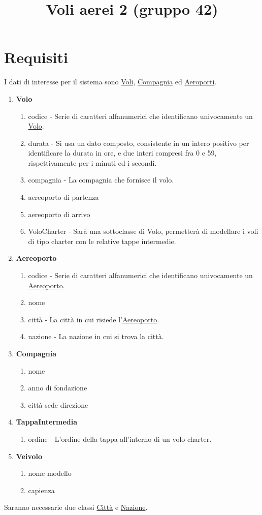 \documentclass[12pt, letterpaper]{article}
\title{Voli aerei 2 (gruppo 42)}
\date{}
\begin{document}
\maketitle


\section{Requisiti}

I dati di interesse per il sistema sono \underline{Voli}, \underline{Compagnia} ed \underline{Aeroporti}.
\begin{enumerate}
    \item \textbf{Volo}\begin{enumerate}
        \item codice - Serie di caratteri alfanumerici che identificano univocamente un \underline{Volo}.
        \item durata - Si usa un dato composto, consistente in un intero positivo per identificare la durata in ore, e due interi 
        compresi fra 0 e 59, rispettivamente per i minuti ed i secondi.
        \item compagnia - La compagnia che fornisce il volo.
        \item aereoporto di partenza 
        \item aereoporto di arrivo
        \item VoloCharter - Sarà una sottoclasse di Volo, permetterà di modellare i voli di tipo charter con le 
        relative tappe intermedie.
    \end{enumerate}
    \item \textbf{Aereoporto}\begin{enumerate}
        \item codice - Serie di caratteri alfanumerici che identificano univocamente un \underline{Aereoporto}.
        \item nome 
        \item città - La città in cui risiede l'\underline{Aereoporto}.
        \item nazione - La nazione in cui si trova la città.
    \end{enumerate}
    \item \textbf{Compagnia}\begin{enumerate}
        \item nome 
        \item anno di fondazione 
        \item città sede direzione
    \end{enumerate}
    \item \textbf{TappaIntermedia}\begin{enumerate}
        \item ordine - L'ordine della tappa all'interno di un volo charter.
    \end{enumerate}
    \item \textbf{Veivolo}\begin{enumerate}
        \item nome modello 
        \item capienza
    \end{enumerate}
\end{enumerate}
Saranno necessarie due classi \underline{Città} e \underline{Nazione}.\newpage
\end{document}
